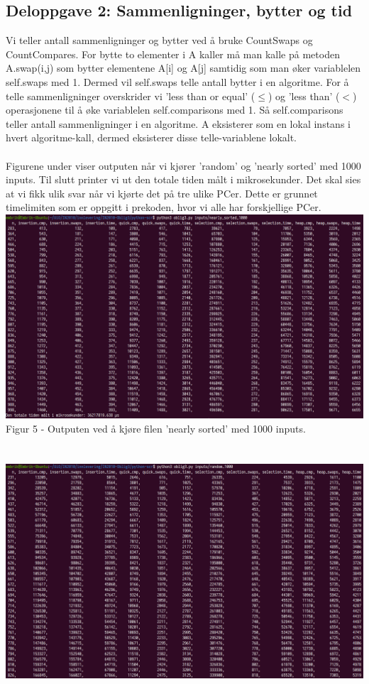 \documentclass[a4paper, article, oneside, norsk]{memoir} %
\newcommand{\0}{\mathbf{0}}
\newcommand{\1}{\mathbf{1}}
\begin{document}
\subsection*{Deloppgave 2: Sammenligninger, bytter og tid}
Vi teller antall sammenligninger og bytter ved å bruke CountSwaps og CountCompares. For bytte to elementer i A kaller må man kalle på metoden A.swap(i,j) som bytter elementene A[i] og A[j] samtidig som man øker variablelen self.swaps med 1. Dermed vil self.swaps telle antall bytter i en algoritme. For å telle sammenligninger overskrider vi 'less than or equal' ($\leq$) og 'less than' ($<$) operasjonene til å øke variablelen self.comparisons med 1. Så self.comparisons teller antall sammenligninger i en algoritme. A eksisterer som en lokal instans i hvert algoritme-kall, dermed eksisterer disse telle-variablene lokalt.
\\
\\
Figurene under viser outputen når vi kjører 'random' og 'nearly sorted' med 1000 inputs. Til slutt printer vi ut den totale tiden målt i mikrosekunder. Det skal sies at vi fikk ulik svar når vi kjørte det på tre ulike PCer. Dette er grunnet timelimiten som er oppgitt i prekoden, hvor vi alle har forskjellige PCer.
\\
\includegraphics[scale=0.2]{IN2010oblig3_oppgave2a.png}
\\
Figur 5 - Outputen ved å kjøre filen 'nearly sorted' med 1000 inputs.
\\
\\
\\
\includegraphics[scale=0.2]{IN2010oblig3_oppgave2c.png}
\end{document}
